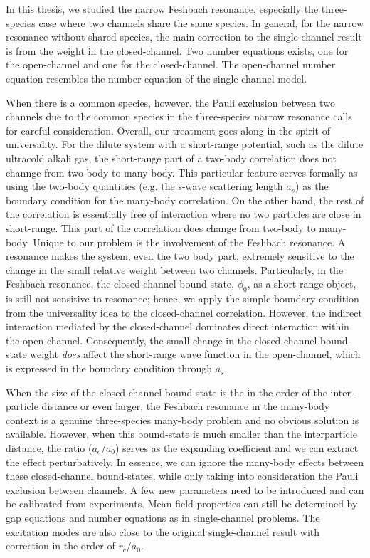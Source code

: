 % 
In this thesis, we studied the narrow Feshbach resonance, especially the three-species case where two channels share the same species.  In general, for the narrow resonance without shared species, the main correction to the single-channel result is from the weight in the closed-channel.  Two number equations exists, one for the open-channel and one for the closed-channel.  The open-channel number equation resembles the number equation of the single-channel model.

When there is a common species,  however, the  Pauli exclusion between two channels due to the common species in the three-species narrow resonance calls for careful  consideration.  Overall, our treatment goes along in the spirit of universality.  For the dilute system with a short-range potential, such as the dilute ultracold alkali gas, the short-range part of a two-body correlation does not channge from two-body  to many-body.  This particular feature serves formally as using the two-body quantities (e.g. the s-wave scattering length $a_{s}$) as the boundary condition for the many-body correlation.  On the other hand, the rest of the correlation is essentially free of interaction where no two particles are close in short-range. This part of the correlation does change from two-body to many-body.  Unique to our problem is the involvement of the Feshbach resonance.  A resonance makes the system, even the two body part, extremely sensitive to the change in the small relative weight between two channels. Particularly, in the Feshbach resonance, the closed-channel bound state, $\phi_{0}$, as a short-range object,  is still not sensitive to resonance; hence, we apply the simple boundary condition from the universality idea to the closed-channel correlation. However, the indirect interaction mediated by the closed-channel dominates direct interaction within the open-channel. Consequently, the small change in the closed-channel bound-state weight \emph{does} affect the short-range wave function in the open-channel, which is expressed in the boundary condition through $a_{s}$. 

When the size of  the closed-channel bound state is the in the order of the   inter-particle distance or even larger, the Feshbach resonance in the many-body context is a genuine three-species many-body problem and no obvious solution is available.  However, when this bound-state is much smaller than the interparticle distance, the ratio ($a_{c}/a_{0}$) serves as the expanding coefficient and we can extract  the effect perturbatively.  In essence, we can ignore the many-body effects between these closed-channel bound-states, while only taking into consideration  the Pauli exclusion between channels.  A few new parameters need to be introduced and can be calibrated from experiments.  Mean field properties can still be determined by gap equations and number equations as in single-channel problems.  The excitation modes are also close to the original single-channel result with correction in the order of $r_{c}/a_{0}$.

